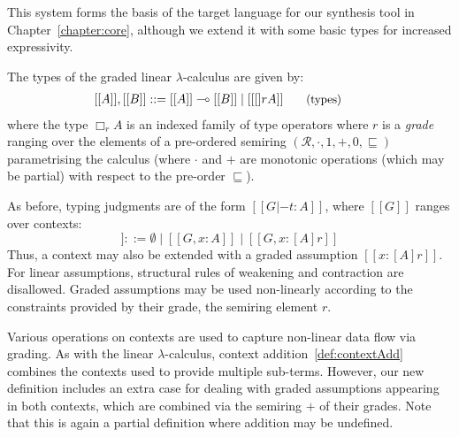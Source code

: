
This system forms the basis of the target language for our synthesis tool in
Chapter~\ref{chapter:core}, although we extend it with some basic types for 
increased expressivity.

The types of the graded linear $\lambda$-calculus are given by:
\begin{align*}
\hspace{-0.9em}[[ A ]] , [[ B ]] & ::=
       [[ A ]] \multimap [[ B ]]
  \mid [[ [] r A ]]
{\small{\tag{types}}}
\end{align*}
where the type $\Box_{r} A$ is an indexed family of type operators where $r$ is
a \textit{grade} ranging over the elements of a pre-ordered semiring
$({\mathcal{R}}, \cdot, {1}, {+}, {0}, {\sqsubseteq})$ parametrising the
calculus (where $\cdot$ and $+$ are monotonic operations (which may be partial)
with respect to the pre-order $\sqsubseteq$). 

As before, typing judgments are of the form $[[ G |- t : A ]]$, where $[[ G ]]$
ranges over contexts:
\begin{equation*}
  [[ G ]] ::= \emptyset
  \mid [[ G , x : A ]]
  \mid [[ G , x : [ A ] r ]]
\tag{contexts}
\end{equation*}
Thus, a context may also be extended with a graded assumption $[[x : [A] r]]$.
For linear assumptions, structural rules of weakening and contraction are
disallowed. Graded assumptions may be used non-linearly according to the
constraints provided by their grade, the semiring element $r$. 

Various operations on contexts are used to capture non-linear data flow via
grading. As with the linear $\lambda$-calculus, context
addition~\eqref{def:contextAdd} combines the contexts used to provide multiple
sub-terms. However, our new definition includes an extra case for dealing with
graded assumptions appearing in both contexts, which are combined
via the semiring $+$ of their grades. Note that this is again a partial definition
where addition may be undefined.

